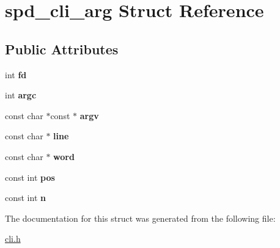 \hypertarget{structspd__cli__arg}{
\section{spd\_\-cli\_\-arg Struct Reference}
\label{structspd__cli__arg}
}
\subsection*{Public Attributes}
\begin{DoxyCompactItemize}
\item 
\hypertarget{structspd__cli__arg_ad6b09a0cc65bae2c3b1197ff5d4b71cc}{
int {\bfseries fd}}
\label{structspd__cli__arg_ad6b09a0cc65bae2c3b1197ff5d4b71cc}

\item 
\hypertarget{structspd__cli__arg_af9cb6a420850b9857d65feb3714a42fd}{
int {\bfseries argc}}
\label{structspd__cli__arg_af9cb6a420850b9857d65feb3714a42fd}

\item 
\hypertarget{structspd__cli__arg_a0a1d6dbdbd559851563e784d9bf00595}{
const char $\ast$const $\ast$ {\bfseries argv}}
\label{structspd__cli__arg_a0a1d6dbdbd559851563e784d9bf00595}

\item 
\hypertarget{structspd__cli__arg_a1af45718e571564ce9028dd366f202b2}{
const char $\ast$ {\bfseries line}}
\label{structspd__cli__arg_a1af45718e571564ce9028dd366f202b2}

\item 
\hypertarget{structspd__cli__arg_ade6adc1a0243209e11355d824b3c71cb}{
const char $\ast$ {\bfseries word}}
\label{structspd__cli__arg_ade6adc1a0243209e11355d824b3c71cb}

\item 
\hypertarget{structspd__cli__arg_a63e3b677886b9d1fc90a73f3baebc6c8}{
const int {\bfseries pos}}
\label{structspd__cli__arg_a63e3b677886b9d1fc90a73f3baebc6c8}

\item 
\hypertarget{structspd__cli__arg_a0604cf7b413d640fdae059f9ad599bdd}{
const int {\bfseries n}}
\label{structspd__cli__arg_a0604cf7b413d640fdae059f9ad599bdd}

\end{DoxyCompactItemize}


The documentation for this struct was generated from the following file:\begin{DoxyCompactItemize}
\item 
\hyperlink{cli_8h}{cli.h}\end{DoxyCompactItemize}

